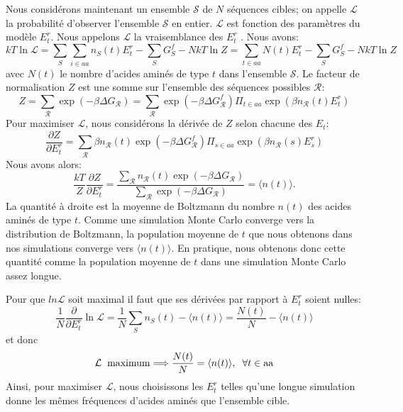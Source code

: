 Nous considérons maintenant un ensemble $\mathcal{S}$ de $N$ séquences cibles; on appelle $\mathcal{L}$ la probabilité d'observer l'ensemble $\mathcal{S}$ en entier. $\mathcal{L}$ est fonction des paramètres du modèle $E_t^r$. Nous appelons $\mathcal{L}$ la vraisemblance des $E_t^r$ \cite{Kleinman06}. Nous avons:
\begin{equation}
  kT \ln \mathcal{L} = \sum_S\sum_{i \in aa} n_S(t) E^r_t - \sum_S G^f_S - N kT \ln Z = \sum_{t \in aa} N(t) E^r_t - \sum_S G^f_S - N kT \ln Z
\end{equation}
avec $N(t)$ le nombre d'acides aminés de type $t$ dans l'ensemble $\mathcal{S}$. Le facteur de normalisation $Z$ est une somme sur l'ensemble des séquences possibles $\mathcal{R}$:
\begin{equation}
  Z=\sum_{\mathcal{R}} \exp(-\beta \Delta G_{\mathcal{R}}) = \sum_{\mathcal{R}} \exp(-\beta\Delta G^f_{\mathcal{R}}) \Pi_{t\in aa}\exp(\beta n_{\mathcal{R}} (t) E^r_t)
\end{equation} 
Pour maximiser $\mathcal{L}$, nous considérons la dérivée de $Z$ selon chacune des $E_t$:
\begin{equation}
\frac{ \partial Z }{ \partial E^r_t } = 
   \sum_{\mathcal{R}} \beta n_{\mathcal{R}}(t) \exp (-\beta \Delta G^f_{\mathcal{R}}) \Pi_{s \in aa} \exp(\beta n_{\mathcal{R}}(s) E^r_s) 
\end{equation}
Nous avons alors:
\begin{equation}
\frac{kT}{Z} \frac{ \partial Z }{ \partial E^r_t }
   = \frac{ \sum_{\mathcal{R}} n_{\mathcal{R}}(t) \exp(-\beta \Delta G_{\mathcal{R}}) }{ \sum_{\mathcal{R}} \exp(-\beta \Delta G_{\mathcal{R}}) } = \langle n(t) \rangle.
\end{equation}
La quantité à droite est la moyenne de Boltzmann du nombre $n(t)$ des acides aminés de type $t$. Comme une simulation Monte Carlo converge vers la distribution de Boltzmann, la population moyenne de $t$ que nous obtenons dans nos simulations converge vers $\langle n(t)\rangle$. En pratique, nous obtenons donc cette quantité comme la population moyenne de $t$ dans une simulation Monte Carlo assez longue. 

Pour que $ln \mathcal{L}$ soit maximal il faut que ses dérivées par rapport à $E_t^r$ soient nulles:
\begin{equation}
\frac{1}{N} \frac{\partial}{\partial E^r_t} \ln {\mathcal L} = \frac{1}{N} \sum_S n_S(t) - \langle n(t) \rangle 
   = \frac{N(t)}{N} - \langle n(t) \rangle
\end{equation}
et donc
\begin{displaymath}
{\mathcal L} \hspace*{2mm} {\rm maximum} \Longrightarrow \frac{N(t)}{N} = \langle n(t) \rangle, 
\hspace*{2mm} \forall t \in {\rm aa}
\label{eq:optimum}
\end{displaymath}
Ainsi, pour maximiser $\mathcal{L}$, nous choisissons les ${E^r_t}$ telles qu'une longue simulation donne les mêmes fréquences d'acides aminés que l'ensemble cible.


